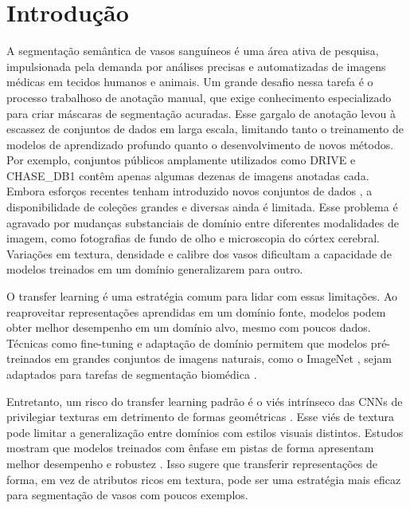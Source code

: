 \documentclass[%
reprint,
nofootinbib,
 amsmath,amssymb,
aps,
floatfix,
superscriptaddress,
showkeys,
longbibliography
]{revtex4-1}
\begin{document}

\maketitle
\thispagestyle{plain}

\section{Introdução}
\label{sec:introduction}

A segmentação semântica de vasos sanguíneos é uma área ativa de pesquisa, impulsionada pela demanda por análises precisas e automatizadas de imagens médicas em tecidos humanos e animais. Um grande desafio nessa tarefa é o processo trabalhoso de anotação manual, que exige conhecimento especializado para criar máscaras de segmentação acuradas. Esse gargalo de anotação levou à escassez de conjuntos de dados em larga escala, limitando tanto o treinamento de modelos de aprendizado profundo quanto o desenvolvimento de novos métodos. Por exemplo, conjuntos públicos amplamente utilizados como DRIVE \cite{Staal2004} e CHASE\_DB1 \cite{Fraz2012ensemble} contêm apenas algumas dezenas de imagens anotadas cada. Embora esforços recentes tenham introduzido novos conjuntos de dados \cite{jin2022fives, fhima2024lunet}, a disponibilidade de coleções grandes e diversas ainda é limitada. Esse problema é agravado por mudanças substanciais de domínio entre diferentes modalidades de imagem, como fotografias de fundo de olho e microscopia do córtex cerebral. Variações em textura, densidade e calibre dos vasos dificultam a capacidade de modelos treinados em um domínio generalizarem para outro.

O transfer learning é uma estratégia comum para lidar com essas limitações. Ao reaproveitar representações aprendidas em um domínio fonte, modelos podem obter melhor desempenho em um domínio alvo, mesmo com poucos dados. Técnicas como fine-tuning e adaptação de domínio permitem que modelos pré-treinados em grandes conjuntos de imagens naturais, como o ImageNet \cite{JiaDeng2009}, sejam adaptados para tarefas de segmentação biomédica \cite{zoetmulderDomainTaskspecificTransfer2022}.

Entretanto, um risco do transfer learning padrão é o viés intrínseco das CNNs de privilegiar texturas em detrimento de formas geométricas \cite{geirhos2018, islam2021shape}. Esse viés de textura pode limitar a generalização entre domínios com estilos visuais distintos. Estudos mostram que modelos treinados com ênfase em pistas de forma apresentam melhor desempenho e robustez \cite{geirhos2018}. Isso sugere que transferir representações de forma, em vez de atributos ricos em textura, pode ser uma estratégia mais eficaz para segmentação de vasos com poucos exemplos.
\end{document}
